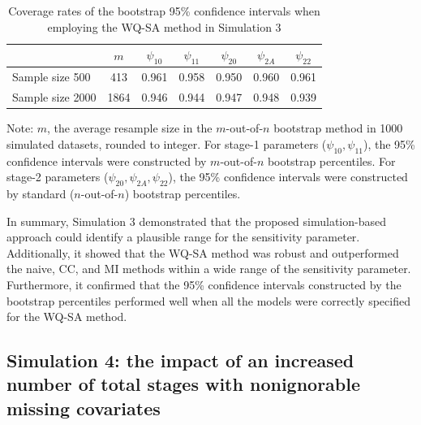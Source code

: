 \documentclass[12pt]{article}
\begin{document}
\begin{table}[htbp]
  \centering
  \caption{Coverage rates of  the bootstrap 95\% confidence intervals when employing the WQ-SA method in Simulation 3}
  \begin{threeparttable}
    \begin{tabular}{lcccccc}
    \hline
     & $m$& $\psi_{10}$ & $\psi_{11}$ & $\psi_{20}$ & $\psi_{2A}$ & $\psi_{22}$ \\
    \hline
     Sample size 500 &413 & 0.961 & 0.958 & 0.950 & 0.960 & 0.961 \\
     Sample size 2000 &1864 & 0.946 & 0.944 & 0.947 & 0.948 & 0.939 \\
    \hline
    \end{tabular}
\begin{tablenotes}
    \small
    \item Note: $m$, the average resample size in the $m$-out-of-$n$ bootstrap method in 1000 simulated datasets, rounded to integer. For stage-1 parameters ($\psi_{10}, \psi_{11}$), the 95\% confidence intervals were constructed by $m$-out-of-$n$ bootstrap percentiles. For stage-2 parameters ($\psi_{20}, \psi_{2A}, \psi_{22}$), the 95\% confidence intervals were constructed by standard ($n$-out-of-$n$) bootstrap percentiles. 
\end{tablenotes}
  \end{threeparttable}
  \label{WQ-SA_CI_coverage}%
\end{table}%

In summary, Simulation 3 demonstrated that the proposed simulation-based approach could identify a plausible range for the sensitivity parameter. Additionally, it showed that the WQ-SA method was robust and outperformed the naive, CC, and MI methods within a wide range of the sensitivity parameter. Furthermore, it confirmed that the 95\% confidence intervals constructed by the bootstrap percentiles performed well when all the models were correctly specified for the WQ-SA method. 


\subsection{Simulation 4: the impact of an increased number of total stages with nonignorable missing covariates}
\end{document}
